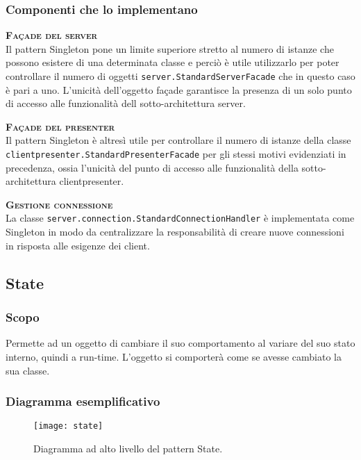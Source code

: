 \subsubsection{Componenti che lo implementano}
\begin{description}
  \item{\scshape\bfseries Façade del server}\\
Il pattern Singleton pone un limite superiore stretto al numero di istanze che possono esistere di una determinata classe e perciò è utile utilizzarlo per poter controllare il numero di oggetti \texttt{server.StandardServerFacade} che in questo caso è pari a uno. L'unicità dell'oggetto façade garantisce la presenza di un solo punto di accesso alle funzionalità dell sotto-architettura server.
  \item{\scshape\bfseries Façade del presenter}\\
Il pattern Singleton è altresì utile per controllare il numero di istanze della classe \texttt{clientpresenter.StandardPresenterFacade} per gli stessi motivi evidenziati in precedenza, ossia l'unicità del punto di accesso alle funzionalità della sotto-architettura clientpresenter.
  \item{\scshape\bfseries Gestione connessione}\\
La classe \texttt{server.connection.StandardConnectionHandler} è implementata come Singleton in modo da centralizzare la responsabilità di creare nuove connessioni in risposta alle esigenze dei client.
\end{description}

\subsection{State}

\subsubsection{Scopo}
Permette ad un oggetto di cambiare il suo comportamento al variare del suo stato interno, quindi a run-time. L'oggetto si comporterà come se avesse cambiato la sua classe.

\subsubsection{Diagramma esemplificativo}
\begin{figure}[h]
\centering
\texttt{[image: state]}
\caption{Diagramma ad alto livello del pattern State.}\label{fig:state}
\end{figure}

